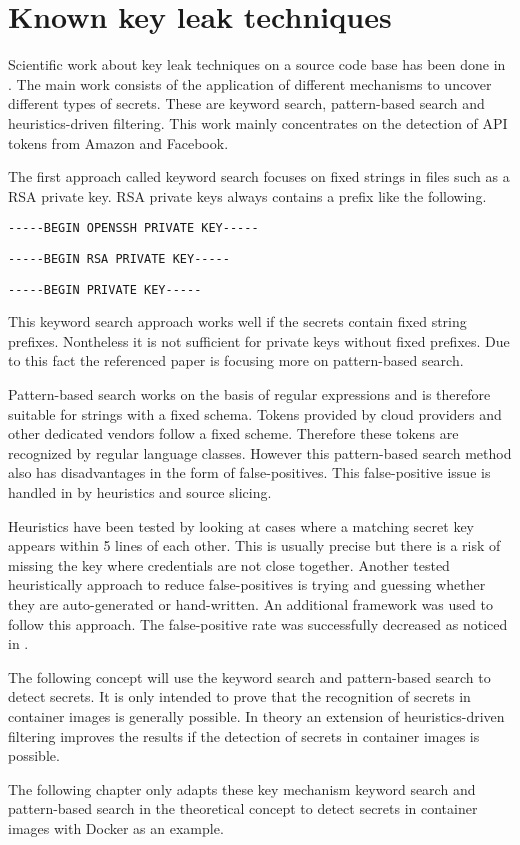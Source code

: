 %
%

\chapter{Known key leak techniques}
\label{ch:known_key_leak_techniques}
Scientific work about key leak techniques on a source code base has been done in \cite{7180102}. 
The main work consists of the application of different mechanisms to uncover different types of secrets.
These are keyword search, pattern-based search and heuristics-driven filtering.
This work mainly concentrates on the detection of API tokens from Amazon and Facebook.
	
The first approach called keyword search focuses on fixed strings in files such as a RSA private key. 
RSA private keys always contains a prefix like the following.
\begin{lstlisting}
-----BEGIN OPENSSH PRIVATE KEY-----
\end{lstlisting}
\begin{lstlisting}
-----BEGIN RSA PRIVATE KEY-----
\end{lstlisting}
\begin{lstlisting}
-----BEGIN PRIVATE KEY-----
\end{lstlisting}
This keyword search approach works well if the secrets contain fixed string prefixes. 
Nontheless it is not sufficient for private keys without fixed prefixes.
Due to this fact the referenced paper \cite{7180102} is focusing more on pattern-based search. 

Pattern-based search works on the basis of regular expressions and is therefore suitable for strings with a fixed schema.
Tokens provided by cloud providers and other dedicated vendors follow a fixed scheme. Therefore these tokens are recognized by regular language classes.
However this pattern-based search method also has disadvantages in the form of false-positives.
This false-positive issue is handled in \cite{7180102} by heuristics and source slicing.

Heuristics have been tested by looking at cases where a matching secret key appears within 5 lines of each other. 
This is usually precise but there is a risk of missing the key where credentials are not close together.
Another tested heuristically approach to reduce false-positives is trying and guessing whether they are auto-generated or hand-written. 
An additional framework was used to follow this approach. 
The false-positive rate was successfully decreased as noticed in \cite{7180102}.

The following concept will use the keyword search and pattern-based search to detect secrets. 
It is only intended to prove that the recognition of secrets in container images is generally possible. 
In theory an extension of heuristics-driven filtering improves the results if the detection of secrets in container images is possible.

The following chapter only adapts these key mechanism keyword search and pattern-based search in the theoretical concept to detect secrets in container images with Docker as an example.